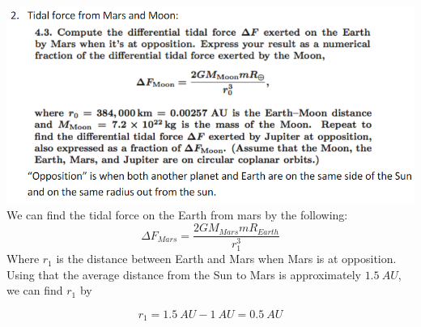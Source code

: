 \documentclass{article}
\begin{document}
\section{}


\includegraphics[scale = 0.8]{probset2prob2.PNG}
We can find the tidal force on the Earth from mars by the following:
\begin{equation}
    \Delta F_{Mars} = \frac{2GM_{Mars}mR_{Earth}}{r_1^3}
\end{equation}
Where $r_1$ is the distance between Earth and Mars when Mars is at opposition. Using that the average distance from the Sun to Mars is approximately $1.5 \: AU$, we can find $r_1$ by



\begin{equation}
    r_1 = 1.5 \: AU - 1 \: AU = 0.5 \: AU
\end{equation}
\end{document}
